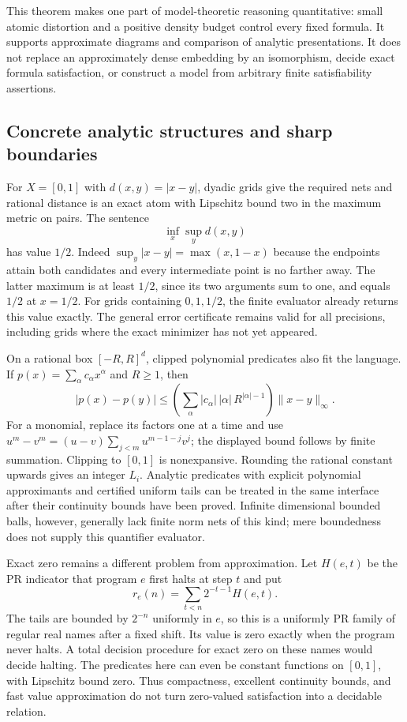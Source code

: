 This theorem makes one part of model-theoretic reasoning quantitative:
small atomic distortion and a positive density budget control every fixed
formula. It supports approximate diagrams and comparison of analytic
presentations. It does not replace an approximately dense embedding by an
isomorphism, decide exact formula satisfaction, or construct a model from
arbitrary finite satisfiability assertions.

\subsection{Concrete analytic structures and sharp boundaries}

For $X=[0,1]$ with $d(x,y)=|x-y|$, dyadic grids give the required nets and
rational distance is an exact atom with Lipschitz bound two in the maximum
metric on pairs. The sentence
\[
 \inf_x\sup_y d(x,y)
\]
has value $1/2$. Indeed $\sup_y|x-y|=\max(x,1-x)$ because the endpoints
attain both candidates and every intermediate point is no farther away.
The latter maximum is at least $1/2$, since its two arguments sum to one,
and equals $1/2$ at $x=1/2$. For grids containing $0,1,1/2$, the finite
evaluator already returns this value exactly. The general error certificate
remains valid for all precisions, including grids where the exact minimizer
has not yet appeared.

On a rational box $[-R,R]^d$, clipped polynomial predicates also fit the
language. If $p(x)=\sum_\alpha c_\alpha x^\alpha$ and $R\geq1$, then
\[
 |p(x)-p(y)|\leq
 \left(\sum_\alpha |c_\alpha|\,|\alpha|\,R^{|\alpha|-1}\right)
 \|x-y\|_\infty.
\]
For a monomial, replace its factors one at a time and use
$u^m-v^m=(u-v)\sum_{j<m}u^{m-1-j}v^j$; the displayed bound follows by
finite summation. Clipping to $[0,1]$ is nonexpansive. Rounding the rational
constant upwards gives an integer $L_i$. Analytic predicates with explicit
polynomial approximants and certified uniform tails can be treated in the
same interface after their continuity bounds have been proved. Infinite
dimensional bounded balls, however, generally lack finite norm nets of this
kind; mere boundedness does not supply this quantifier evaluator.

Exact zero remains a different problem from approximation. Let
$H(e,t)$ be the PR indicator that program $e$ first halts at step $t$ and put
\[
 r_e(n)=\sum_{t<n}2^{-t-1}H(e,t).
\]
The tails are bounded by $2^{-n}$ uniformly in $e$, so this is a uniformly
PR family of regular real names after a fixed shift. Its value is zero
exactly when the program never halts. A total decision procedure for exact
zero on these names would decide halting. The predicates here can even be
constant functions on $[0,1]$, with Lipschitz bound zero. Thus compactness,
excellent continuity bounds, and fast value approximation do not turn
zero-valued satisfaction into a decidable relation.

